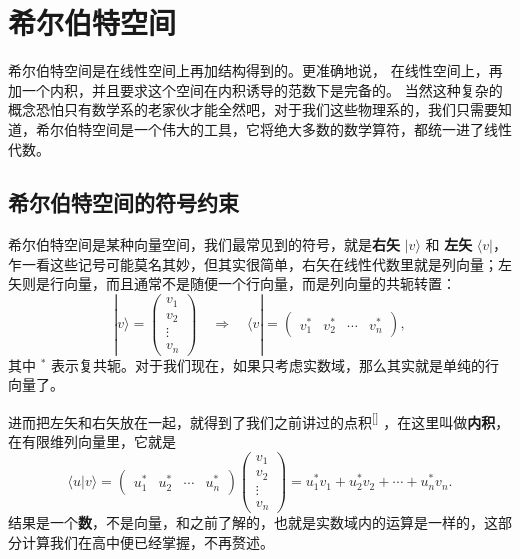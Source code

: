 \documentclass[UTF8]{ctexbook}
\begin{document}
\newpage
\section{希尔伯特空间}

希尔伯特空间是在线性空间上再加结构得到的。更准确地说，
在线性空间上，再加一个内积，并且要求这个空间在内积诱导的范数下是完备的。
当然这种复杂的概念恐怕只有数学系的老家伙才能全然吧，对于我们这些物理系的，我们只需要知道，希尔伯特空间是一个伟大的工具，它将绝大多数的数学算符，都统一进了线性代数。

\subsection{希尔伯特空间的符号约束}

希尔伯特空间是某种向量空间，我们最常见到的符号，就是\textbf{右矢} $|v\rangle$ 和 \textbf{左矢} $\langle v|$，乍一看这些记号可能莫名其妙，但其实很简单，右矢在线性代数里就是列向量；左矢则是行向量，而且通常不是随便一个行向量，而是列向量的共轭转置：
\[
|v\rangle=
\begin{pmatrix}
v_1\\
v_2\\
\vdots\\
v_n
\end{pmatrix}
\quad\Longrightarrow\quad
\langle v|
=
\begin{pmatrix}
v_1^* & v_2^* & \cdots & v_n^*
\end{pmatrix},
\]
其中 \(^*\) 表示复共轭。对于我们现在，如果只考虑实数域，那么其实就是单纯的行向量了。

进而把左矢和右矢放在一起，就得到了我们之前讲过的点积\textsuperscript{[\pageref{dotp}]}
，在这里叫做\textbf{内积}，
在有限维列向量里，它就是
\[
\langle u|v\rangle
=
\begin{pmatrix}
u_1^* & u_2^* & \cdots & u_n^*
\end{pmatrix}
\begin{pmatrix}
v_1\\
v_2\\
\vdots\\
v_n
\end{pmatrix}
=
u_1^*v_1+u_2^*v_2+\cdots+u_n^*v_n.
\]
结果是一个\textbf{数}，不是向量，和之前了解的，也就是实数域内的运算是一样的，这部分计算我们在高中便已经掌握，不再赘述。
\end{document}
